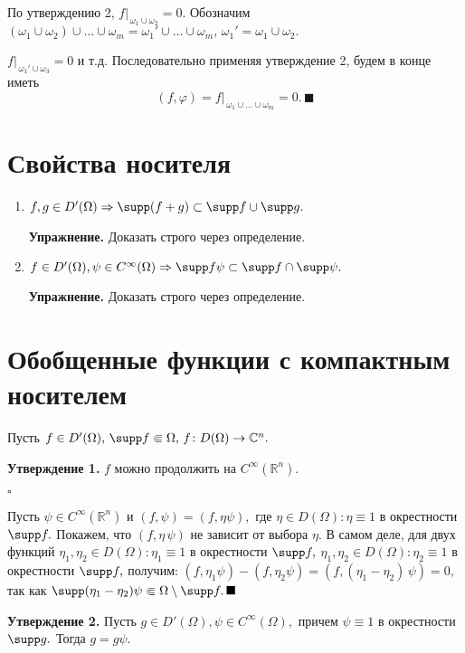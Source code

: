 \documentclass[12pt,a4paper,draft]{article}
\DeclareRobustCommand*{\т}{~--- }
\DeclareRobustCommand*{\ч}{~-- }
\begin{document}
По утверждению 2, $f|_{\,\omega_1\cup\omega_2}=0.$ Обозначим
$(\omega_1\cup\omega_2)\cup\ldots\cup\omega_m={\omega_1}'\cup\ldots\cup\omega_m,\,{\omega_1}'=\omega_1\cup\omega_2.
$

$f|_{\,{\omega_1}'\cup\omega_3}=0$ и т.д. Последовательно применяя
утверждение 2, будем в конце иметь
$$(f,\varphi)=f|_{\,\omega_1\cup\ldots\cup\omega_m}=0.\,\blacksquare$$



\section{Свойства носителя}

\begin{enumerate}
\item $f,g\in D' (\Omega) \Rightarrow \supp (f+g)\subset \supp f\cup
\supp g.$

\textbf{Упражнение.} Доказать строго через определение.
\item $f\in D' (\Omega), \psi\in C^{\infty}(\Omega) \Rightarrow \supp f\psi\subset \supp f\cap
\supp \psi.$

\textbf{Упражнение.} Доказать строго через определение.
\end{enumerate}

\section{Обобщенные функции с компактным носителем}

Пусть $f\in D' (\Omega),\, \supp f\Subset\Omega,\, f\colon
D(\Omega)\to \mathbb C^n.$

\textbf{Утверждение 1.} $f$ можно продолжить на
$C^{\infty}(\mathbb R^n).$

$\square$

Пусть $\psi\in C^{\infty}(\mathbb R^n)$ и $(f,\psi)=(f,\eta\psi),$
где $\eta\in D(\Omega)\colon \eta\equiv1$ в окрестности $\supp f.$
Покажем, что $(f,\eta\,\psi)$ не зависит от выбора $\eta.$ В самом
деле, для двух функций $\eta_1,\eta_2\in D(\Omega)\colon
\eta_1\equiv1$ в окрестности $\supp f,$ $\eta_1,\eta_2\in
D(\Omega)\colon \eta_2\equiv1$ в окрестности $\supp f,$ получим:
$(f,\eta_1\psi)-(f,\eta_2\psi)=(f,(\eta_1-\eta_2)\,\psi)=0,$ так
как $\supp (\eta_1-\eta_2)\psi\Subset\Omega\setminus \supp f.
\,\blacksquare$

\textbf{Утверждение 2.} Пусть $g\in D' (\Omega), \psi\in
C^{\infty}(\Omega),$ причем $\psi \equiv1$ в окрестности $\supp
g.$ Тогда $g=g\psi.$
\end{document}
